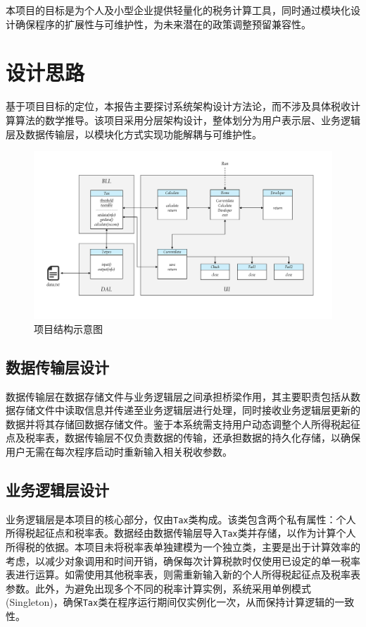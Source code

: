 \documentclass[a4paper, utf8]{ctexart}
\begin{document}
    本项目的目标是为个人及小型企业提供轻量化的税务计算工具，同时通过模块化设计确保程序的扩展性与可维护性，为未来潜在的政策调整预留兼容性。

    \section{设计思路}

    基于项目目标的定位，本报告主要探讨系统架构设计方法论，而不涉及具体税收计算算法的数学推导。该项目采用分层架构设计，整体划分为用户表示层、业务逻辑层及数据传输层，以模块化方式实现功能解耦与可维护性。

    \begin{figure}
        \centering
        \includegraphics[width=0.95\linewidth]{figure/Structure.png}
        \caption{项目结构示意图}
    \end{figure}

    \subsection{数据传输层设计}

    数据传输层在数据存储文件与业务逻辑层之间承担桥梁作用，其主要职责包括从数据存储文件中读取信息并传递至业务逻辑层进行处理，同时接收业务逻辑层更新的数据并将其存储回数据存储文件。鉴于本系统需支持用户动态调整个人所得税起征点及税率表，数据传输层不仅负责数据的传输，还承担数据的持久化存储，以确保用户无需在每次程序启动时重新输入相关税收参数。
    
    \subsection{业务逻辑层设计}

    业务逻辑层是本项目的核心部分，仅由\verb|Tax|类构成。该类包含两个私有属性：个人所得税起征点和税率表。数据经由数据传输层导入\verb|Tax|类并存储，以作为计算个人所得税的依据。本项目未将税率表单独建模为一个独立类，主要是出于计算效率的考虑，以减少对象调用和时间开销，确保每次计算税款时仅使用已设定的单一税率表进行运算。如需使用其他税率表，则需重新输入新的个人所得税起征点及税率表参数。此外，为避免出现多个不同的税率计算实例，系统采用单例模式 (Singleton)，确保\verb|Tax|类在程序运行期间仅实例化一次，从而保持计算逻辑的一致性。
\end{document}
